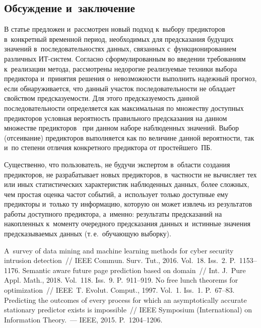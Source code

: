 \begin{multicols}{2}
\vspace*{-6pt}
  
\section{Обсуждение и~заключение}

\vspace*{-2pt}

  В статье предложен и~рассмотрен новый подход к~выбору предикторов 
в~конкретный временной период, необходимых для предсказания будущих 
значений в~последовательностях данных, связанных с~функционированием 
различных ИТ-сис\-тем. Согласно сформулированным во введении 
требованиям к~реализации метода, рассмотрены недорогие реализуемые 
техники выбора предиктора и~принятия решения о~невозможности 
выполнить надежный прогноз, если обнаруживается, что данный участок 
последовательности не обладает свойством предсказуемости. Для этого 
предсказуемость данной последовательности определяется как максимальная 
по множеству доступных предикторов условная вероятность правильного 
предсказания на данном множестве предикторов~\cite{17-fr} при данном 
наборе наблюденных значений. Выбор (отсеивание) предикторов 
выполняется как по величине данной вероятности, так и~по степени отличия 
конкретного предиктора от простейшего~ПБ. 
  
  Существенно, что пользователь, не будучи экспертом в~области создания 
предикторов, не разрабатывает новых предикторов, в~част\-ности не 
вы\-чис\-ля\-ет тех или иных статистических характеристик наблюденных 
данных, более сложных, чем прос\-тая оценка частот событий, а~использует 
только доступные ему предикторы и~только ту информацию, 
которую он может извлечь из результатов работы доступного предиктора, 
а~именно: результаты предсказаний на накопленных к~моменту очередного 
предсказания данных и~истинные значения предсказываемых данных (т.\,е.\ 
обучающую выборку).
{

}

\vspace*{-6pt}
   
{\small\frenchspacing
 {%
 \begin{thebibliography}{99}
 
 \vspace*{-2pt}
  
   A~survey of data mining and machine learning methods for cyber 
security intrusion detection~// IEEE Commun. Surv. Tut., 2016. Vol.~18. Iss.~2. 
P.~1153--1176.
   Semantic aware future page prediction based on domain~// Int. 
J.~Pure Appl. Math., 2018. Vol.~118. Iss.~9. P.~911--919.
   No free lunch theorems for optimization~// IEEE~T. 
Evolut. Comput., 1997. Vol.~1. Iss.~1.  
P.~67--83.
   Predicting the outcomes of every process for which an 
asymptotically accurate stationary predictor exists is impossible~// IEEE Symposium 
(International) on Information Theory.~--- IEEE, 2015. P.~1204--1206.
  

\end{thebibliography}}}
\end{multicols}

